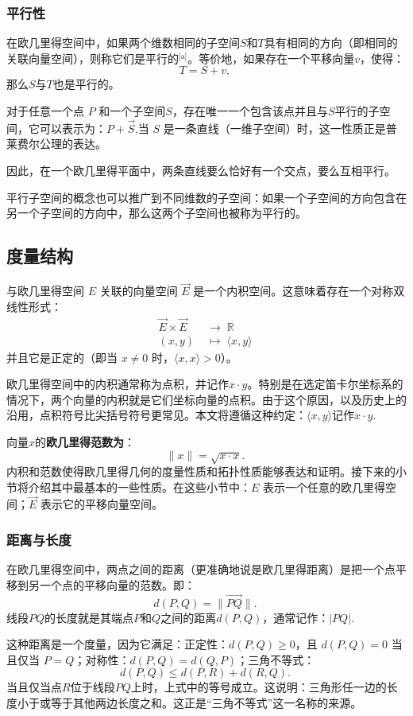 \subsubsection{平行性}
在欧几里得空间中，如果两个维数相同的子空间$S$和$T$具有相同的方向（即相同的关联向量空间），则称它们是平行的\(^\text{[a]}\)。等价地，如果存在一个平移向量$v$，使得：
$$
T = S + v,~
$$
那么$S$与$T$也是平行的。

对于任意一个点 $P$ 和一个子空间$S$，存在唯一一个包含该点并且与$S$平行的子空间，它可以表示为：$P + \overrightarrow{S}$.当 $S$ 是一条直线（一维子空间）时，这一性质正是普莱费尔公理的表达。

因此，在一个欧几里得平面中，两条直线要么恰好有一个交点，要么互相平行。

平行子空间的概念也可以推广到不同维数的子空间：如果一个子空间的方向包含在另一个子空间的方向中，那么这两个子空间也被称为平行的。
\subsection{度量结构}
与欧几里得空间 $E$ 关联的向量空间 $\overrightarrow{E}$ 是一个内积空间。这意味着存在一个对称双线性形式：
$$
\begin{aligned}
\overrightarrow{E} \times \overrightarrow{E} &\;\longrightarrow\; \mathbb{R} \\[6pt]
(x, y) &\;\longmapsto\; \langle x, y \rangle
\end{aligned}~
$$
并且它是正定的（即当 $x \neq 0$ 时，$\langle x, x \rangle > 0$）。

欧几里得空间中的内积通常称为点积，并记作$x \cdot y$。特别是在选定笛卡尔坐标系的情况下，两个向量的内积就是它们坐标向量的点积。由于这个原因，以及历史上的沿用，点积符号比尖括号符号更常见。本文将遵循这种约定：$\langle x, y \rangle $记作$x \cdot y$.

向量$x$的\textbf{欧几里得范数为}：
$$
\|x\| = \sqrt{x \cdot x}.~
$$
内积和范数使得欧几里得几何的度量性质和拓扑性质能够表达和证明。接下来的小节将介绍其中最基本的一些性质。在这些小节中：$E$ 表示一个任意的欧几里得空间；$\overrightarrow{E}$ 表示它的平移向量空间。
\subsubsection{距离与长度}
在欧几里得空间中，两点之间的距离（更准确地说是欧几里得距离）是把一个点平移到另一个点的平移向量的范数。即：
$$
d(P, Q) = \bigl\| \overrightarrow{PQ} \bigr\|.~
$$
线段$PQ$的长度就是其端点$P$和$Q$之间的距离$d(P, Q)$，通常记作：$|PQ|$.

这种距离是一个度量，因为它满足：正定性：$d(P, Q) \ge 0$，且 $d(P, Q) = 0$ 当且仅当 $P = Q$；对称性：$d(P, Q) = d(Q, P)$；三角不等式：
$$
d(P, Q) \le d(P, R) + d(R, Q).~
$$
当且仅当点$R$位于线段$PQ$上时，上式中的等号成立。这说明：三角形任一边的长度小于或等于其他两边长度之和。这正是“三角不等式”这一名称的来源。

